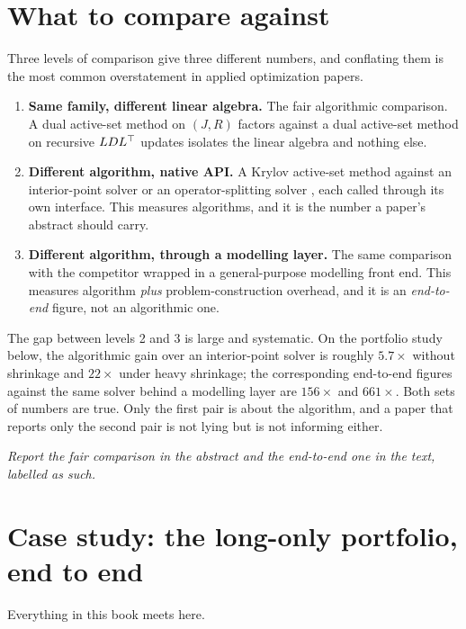 \section{What to compare against}

Three levels of comparison give three different numbers, and conflating them is the most
common overstatement in applied optimization papers.

\begin{enumerate}
\item \textbf{Same family, different linear algebra.} The fair algorithmic comparison.
      A dual active-set method on $(J,R)$ factors against a dual active-set method on
      recursive $LDL^{\top}$ updates \cite{arnstrom2022daqp} isolates the linear algebra and
      nothing else.
\item \textbf{Different algorithm, native API.} A Krylov active-set method against an
      interior-point solver \cite{clarabel2024} or an operator-splitting solver
      \cite{osqp}, each called through its own interface. This measures algorithms, and
      it is the number a paper's abstract should carry.
\item \textbf{Different algorithm, through a modelling layer.} The same comparison with
      the competitor wrapped in a general-purpose modelling front end. This measures
      algorithm \emph{plus} problem-construction overhead, and it is an \emph{end-to-end}
      figure, not an algorithmic one.
\end{enumerate}

The gap between levels 2 and 3 is large and systematic. On the portfolio study below,
the algorithmic gain over an interior-point solver is roughly $5.7\times$ without
shrinkage and $22\times$ under heavy shrinkage; the corresponding end-to-end figures
against the same solver behind a modelling layer are $156\times$ and $661\times$. Both
sets of numbers are true. Only the first pair is about the algorithm, and a paper that
reports only the second pair is not lying but is not informing either.

\emph{Report the fair comparison in the abstract and the end-to-end one in the text,
labelled as such.}

\section{Case study: the long-only portfolio, end to end}

Everything in this book meets here.


